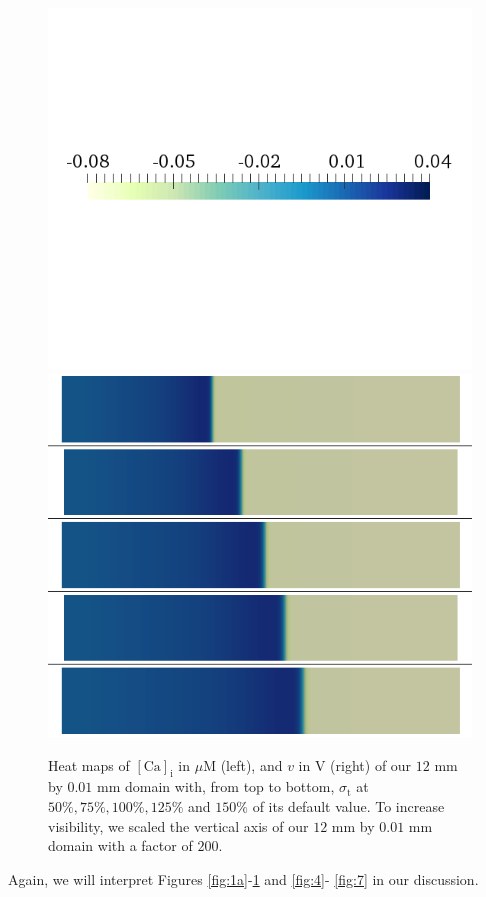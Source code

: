 \documentclass{article}
\begin{document}
\begin{figure}
\begin{minipage}{0.5\textwidth}
\includegraphics[trim=0cm 7cm 0cm 6cm, clip=true, width=1\linewidth]{legend_v2}
\includegraphics[trim=0cm 0cm 0cm 0cm, clip=true, width=1\linewidth]{v_sigma}
    \end{minipage}
    \caption{Heat maps of $[\mathrm{Ca}]_{\mathrm{i}}$ in $\mu$M (left), and $v$ in V (right) of our $12$ mm by $0.01$ mm domain with, from top to bottom, $\sigma_{\mathrm{t}}$ at $50\%, 75\%, 100\%, 125\%$ and $150\%$ of its default value. To increase visibility, we scaled the vertical axis of our $12$ mm by $0.01$ mm domain with a factor of $200$.}
    \label{fig:1e}
\end{figure}
%
%
Again, we will interpret Figures \ref{fig:1a}-\ref{fig:1e} and \ref{fig:4}- \ref{fig:7} in our discussion.
%
\end{document}
